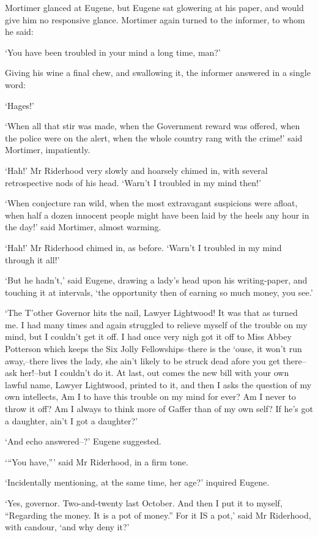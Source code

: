 Mortimer glanced at Eugene, but Eugene sat glowering at his paper,
and would give him no responsive glance. Mortimer again turned to the
informer, to whom he said:

‘You have been troubled in your mind a long time, man?’

Giving his wine a final chew, and swallowing it, the informer answered
in a single word:

‘Hages!’

‘When all that stir was made, when the Government reward was offered,
when the police were on the alert, when the whole country rang with the
crime!’ said Mortimer, impatiently.

‘Hah!’ Mr Riderhood very slowly and hoarsely chimed in, with several
retrospective nods of his head. ‘Warn’t I troubled in my mind then!’

‘When conjecture ran wild, when the most extravagant suspicions were
afloat, when half a dozen innocent people might have been laid by the
heels any hour in the day!’ said Mortimer, almost warming.

‘Hah!’ Mr Riderhood chimed in, as before. ‘Warn’t I troubled in my mind
through it all!’

‘But he hadn’t,’ said Eugene, drawing a lady’s head upon his
writing-paper, and touching it at intervals, ‘the opportunity then of
earning so much money, you see.’

‘The T’other Governor hits the nail, Lawyer Lightwood! It was that as
turned me. I had many times and again struggled to relieve myself of the
trouble on my mind, but I couldn’t get it off. I had once very nigh
got it off to Miss Abbey Potterson which keeps the Six Jolly
Fellowships--there is the ‘ouse, it won’t run away,--there lives the
lady, she ain’t likely to be struck dead afore you get there--ask
her!--but I couldn’t do it. At last, out comes the new bill with your
own lawful name, Lawyer Lightwood, printed to it, and then I asks the
question of my own intellects, Am I to have this trouble on my mind for
ever? Am I never to throw it off? Am I always to think more of Gaffer
than of my own self? If he’s got a daughter, ain’t I got a daughter?’

‘And echo answered--?’ Eugene suggested.

‘“You have,”’ said Mr Riderhood, in a firm tone.

‘Incidentally mentioning, at the same time, her age?’ inquired Eugene.

‘Yes, governor. Two-and-twenty last October. And then I put it to
myself, “Regarding the money. It is a pot of money.” For it IS a pot,’
said Mr Riderhood, with candour, ‘and why deny it?’

